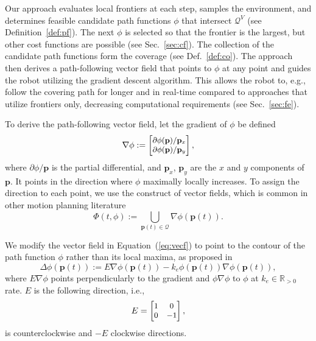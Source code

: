\documentclass[letterpaper,10pt,conference,twoside]{IEEEtran}
\theoremstyle{definition}
\begin{document}
Our 
approach evaluates local frontiers at each step, samples the environment, and determines feasible candidate path functions $\phi$ that intersect $\mathcal{Q}^V$ (see Definition~\ref{def:pf}).
The next $\phi$ is selected so that the frontier is the largest, but other cost functions are possible (see Sec.~\ref{sec:cf}). The collection of the candidate path functions form the coverage (see Def.~\ref{def:co}).
The %
approach then derives a path-following vector field that points to $\phi$ at any point and guides the robot utilizing the gradient descent algorithm. This allows the robot to, e.g., follow the covering path for longer and in real-time compared to approaches that utilize frontiers only, decreasing computational requirements (see Sec.~\ref{sec:fe}).

To derive the path-following vector field, let the gradient of $\phi$ be defined
\begin{equation}\small
  \nabla\phi:=\begin{bmatrix}
    \partial\phi(\mathbf{p})/\mathbf{p}_x\\
    \partial\phi(\mathbf{p})/\mathbf{p}_y
  \end{bmatrix},
\end{equation}
where $\partial\phi/\mathbf{p}$ is the partial differential, and $\mathbf{p}_x$, $\mathbf{p}_y$ are the $x$ and $y$ components of $\mathbf{p}$.
It points in the direction where $\phi$ maximally locally increases. To assign the direction to each point, we use the construct of vector fields, which is common in other motion planning literature~\cite{%
garcia2017guidance,goncalves2010vector}
\begin{equation}\label{eq:vecf}
  \Phi(t,\phi):={\textstyle \bigcup\limits_{\mathbf{p}(t)\in\mathcal{Q}}}\nabla\phi(\mathbf{p}(t)).
\end{equation}

We modify the vector field in Equation~(\ref{eq:vecf}) to point to the contour of the path function $\phi$ rather than its local maxima, as proposed in~\cite{garcia2017guidance}
\begin{equation}\label{eq:pfvf}
  \Delta\phi(\mathbf{p}(t)):=E\nabla\phi(\mathbf{p}(t))-k_e\phi(\mathbf{p}(t))\nabla\phi(\mathbf{p}(t)),
\end{equation}
where $E\nabla\phi$ points perpendicularly to the gradient and $\phi\nabla\phi$ to $\phi$ at $k_e\in\mathbb{R}_{>0}$ rate. $E$ is the following direction, i.e.,
\begin{equation}\small
  E=\begin{bmatrix}
    1 & 0\\ 0 & -1
  \end{bmatrix},
\end{equation}
is counterclockwise and $-E$ clockwise directions.%
\end{document}
